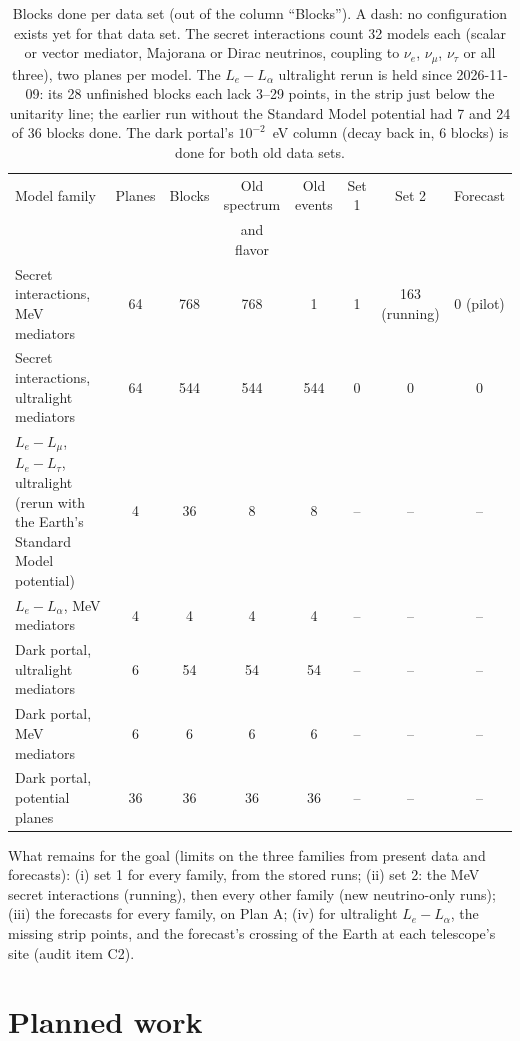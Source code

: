 \documentclass[11pt,a4paper]{article}
\begin{document}
\begin{table}[h!]
\centering
\small
\setlength{\tabcolsep}{4pt}
\begin{tabular}{>{\raggedright\arraybackslash}p{3.6cm}ccccccc}
\toprule
Model family & Planes & Blocks & Old spectrum & Old events & Set 1 & Set 2 & Forecast \\
 & & & and flavor & & & & \\
\midrule
Secret interactions, MeV mediators & 64 & 768 & 768 & 1 & 1 & 163 (running) & 0 (pilot) \\
Secret interactions, ultralight mediators & 64 & 544 & 544 & 544 & 0 & 0 & 0 \\
$L_e - L_\mu$, $L_e - L_\tau$, ultralight (rerun with the Earth's Standard Model potential) & 4 & 36 & 8 & 8 & -- & -- & -- \\
$L_e - L_\alpha$, MeV mediators & 4 & 4 & 4 & 4 & -- & -- & -- \\
Dark portal, ultralight mediators & 6 & 54 & 54 & 54 & -- & -- & -- \\
Dark portal, MeV mediators & 6 & 6 & 6 & 6 & -- & -- & -- \\
Dark portal, potential planes & 36 & 36 & 36 & 36 & -- & -- & -- \\
\bottomrule
\end{tabular}
\caption{\label{tab:run_status}Blocks done per data set (out of the column ``Blocks''). A dash: no configuration
exists yet for that data set. The secret interactions count 32 models each (scalar or vector mediator, Majorana or
Dirac neutrinos, coupling to $\nu_e$, $\nu_\mu$, $\nu_\tau$ or all three), two planes per model. The $L_e - L_\alpha$
ultralight rerun is held since 2026-11-09: its 28 unfinished blocks each lack 3--29 points, in the strip just below
the unitarity line; the earlier run without the Standard Model potential had 7 and 24 of 36 blocks done. The dark
portal's $10^{-2}$~eV column (decay back in, 6 blocks) is done for both old data sets.}
\end{table}

What remains for the goal (limits on the three families from present data and forecasts):
(i) set 1 for every family, from the stored runs;
(ii) set 2: the MeV secret interactions (running), then every other family (new neutrino-only runs);
(iii) the forecasts for every family, on Plan A;
(iv) for ultralight $L_e - L_\alpha$, the missing strip points, and the forecast's crossing of the Earth at each
telescope's site (audit item C2).

\section{Planned work}
\label{sec:plan}
\end{document}
